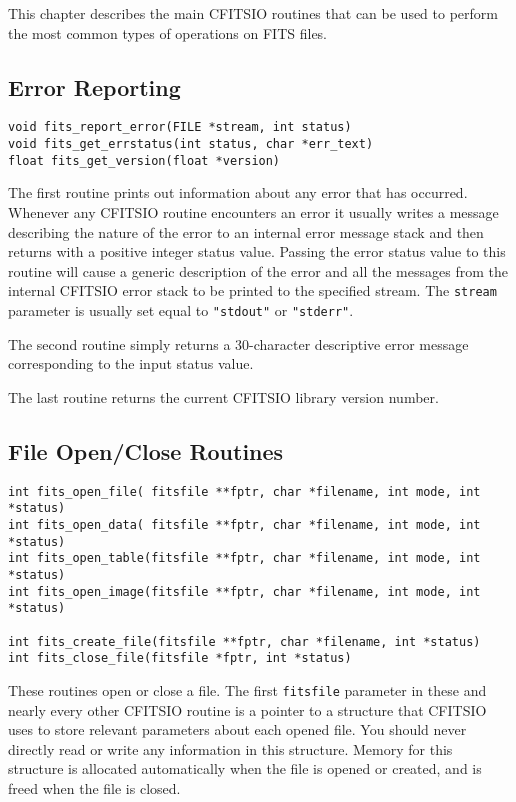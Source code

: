 \documentclass[11pt]{article}
\begin{document}
This chapter describes the main CFITSIO routines that can be used to
perform the most common types of operations on FITS files.

{\bf \subsection{Error Reporting}}

\begin{verbatim}
void fits_report_error(FILE *stream, int status)
void fits_get_errstatus(int status, char *err_text)
float fits_get_version(float *version)
\end{verbatim}

The first routine prints out information about any error that
has occurred.  Whenever any CFITSIO routine encounters an error it
usually writes a message describing the nature of the error to an
internal error message stack and then returns with a positive integer
status value. Passing the error status value to this routine will
cause  a generic description of the error and all the messages
from the internal CFITSIO error stack to be printed to the specified
stream.  The {\tt stream} parameter is usually set equal to
{\tt "stdout"} or {\tt "stderr"}.

The second routine simply returns a 30-character descriptive
error message corresponding to the input status value.

The last routine returns the current CFITSIO library version number.

{\bf \subsection{File Open/Close Routines}}

\begin{verbatim}
int fits_open_file( fitsfile **fptr, char *filename, int mode, int *status)
int fits_open_data( fitsfile **fptr, char *filename, int mode, int *status)
int fits_open_table(fitsfile **fptr, char *filename, int mode, int *status)
int fits_open_image(fitsfile **fptr, char *filename, int mode, int *status)

int fits_create_file(fitsfile **fptr, char *filename, int *status)
int fits_close_file(fitsfile *fptr, int *status)
\end{verbatim}

These routines open or close a file.  The first {\tt fitsfile}
parameter  in these and nearly every other CFITSIO routine is a pointer
to a structure that CFITSIO uses to store relevant parameters about
each opened file.  You should never directly read or write any
information in this structure.  Memory for this structure is allocated
automatically when the file is opened or created, and is freed when the
file is closed.
\end{document}
